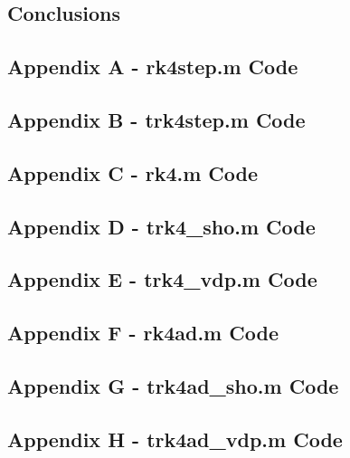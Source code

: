 \documentclass[10pt]{article}
\begin{document}
\subsection*{Conclusions}


\pagebreak


\subsection*{Appendix A - rk4step.m Code}

\pagebreak

\subsection*{Appendix B - trk4step.m Code}

\pagebreak

\subsection*{Appendix C - rk4.m Code}

\pagebreak

\subsection*{Appendix D - trk4\_sho.m Code}

\pagebreak

\subsection*{Appendix E - trk4\_vdp.m Code}

\pagebreak

\subsection*{Appendix F - rk4ad.m Code}

\pagebreak

\subsection*{Appendix G - trk4ad\_sho.m Code}

\pagebreak

\subsection*{Appendix H - trk4ad\_vdp.m Code}

\pagebreak
\end{document}
